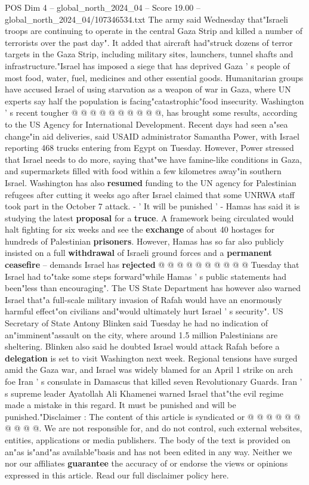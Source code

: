 \begin{textsample}{POS Dim 4 – global\_north\_2024\_04 – Score 19.00 – global\_north\_2024\_04/107346534.txt}
The army said Wednesday that"Israeli troops are continuing to operate in the central Gaza Strip and killed a number of terrorists over the past day".
It added that aircraft had"struck dozens of terror targets in the Gaza Strip, including military sites, launchers, tunnel shafts and infrastructure."Israel has imposed a siege that has deprived Gaza ' s people of most food, water, fuel, medicines and other essential goods.
Humanitarian groups have accused Israel of using starvation as a weapon of war in Gaza, where UN experts say half the population is facing"catastrophic"food insecurity.
Washington ' s recent tougher @ @ @ @ @ @ @ @ @ @, has brought some results, according to the US Agency for International Development.
Recent days had seen a"sea change"in aid deliveries, said USAID administrator Samantha Power, with Israel reporting 468 trucks entering from Egypt on Tuesday.
However, Power stressed that Israel needs to do more, saying that"we have famine-like conditions in Gaza, and supermarkets filled with food within a few kilometres away"in southern Israel.
Washington has also \textbf{resumed} funding to the UN agency for Palestinian refugees after cutting it weeks ago after Israel claimed that some UNRWA staff took part in the October 7 attack. - ' It will be punished ' - Hamas has said it is studying the latest \textbf{proposal} for a \textbf{truce}.
A framework being circulated would halt fighting for six weeks and see the \textbf{exchange} of about 40 hostages for hundreds of Palestinian \textbf{prisoners}.
However, Hamas has so far also publicly insisted on a full \textbf{withdrawal} of Israeli ground forces and a \textbf{permanent} \textbf{ceasefire} -- demands Israel has \textbf{rejected} @ @ @ @ @ @ @ @ @ @ Tuesday that Israel had to"take some steps forward"while Hamas ' s public statements had been"less than encouraging".
The US State Department has however also warned Israel that"a full-scale military invasion of Rafah would have an enormously harmful effect"on civilians and"would ultimately hurt Israel ' s security".
US Secretary of State Antony Blinken said Tuesday he had no indication of an"imminent"assault on the city, where around 1.5 million Palestinians are sheltering.
Blinken also said he doubted Israel would attack Rafah before a \textbf{delegation} is set to visit Washington next week.
Regional tensions have surged amid the Gaza war, and Israel was widely blamed for an April 1 strike on arch foe Iran ' s consulate in Damascus that killed seven Revolutionary Guards.
Iran ' s supreme leader Ayatollah Ali Khamenei warned Israel that"the evil regime made a mistake in this regard.
It must be punished and will be punished."Disclaimer : The content of this article is syndicated or @ @ @ @ @ @ @ @ @ @.
We are not responsible for, and do not control, such external websites, entities, applications or media publishers.
The body of the text is provided on an"as is"and"as available"basis and has not been edited in any way.
Neither we nor our affiliates \textbf{guarantee} the accuracy of or endorse the views or opinions expressed in this article.
Read our full disclaimer policy here.


\end{textsample}
